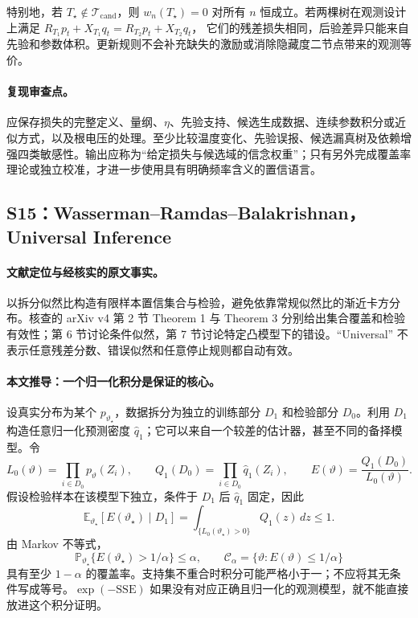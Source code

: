 特别地，若 $T_\star\notin\mathcal T_{\mathrm{cand}}$，则
$w_n(T_\star)=0$ 对所有 $n$ 恒成立。若两棵树在观测设计上满足
$R_{T_1}p_t+X_{T_1}q_t=R_{T_2}p_t+X_{T_2}q_t$，
它们的残差损失相同，后验差异只能来自先验和参数体积。更新规则不会补充缺失的激励或消除隐藏度二节点带来的观测等价。

\paragraph{复现审查点。}
应保存损失的完整定义、量纲、$\eta$、先验支持、候选生成数据、连续参数积分或近似方式，以及根电压的处理。至少比较温度变化、先验误报、候选漏真树及依赖增强四类敏感性。输出应称为“给定损失与候选域的信念权重”；只有另外完成覆盖率理论或独立校准，才进一步使用具有明确频率含义的置信语言。

\subsection{S15：Wasserman--Ramdas--Balakrishnan，Universal Inference}
\label{subsec:S15}

\paragraph{文献定位与经核实的原文事实。}
\citet{S15} 以拆分似然比构造有限样本置信集合与检验，避免依靠常规似然比的渐近卡方分布。核查的 arXiv v4 第 2 节 Theorem 1 与 Theorem 3 分别给出集合覆盖和检验有效性；第 6 节讨论条件似然，第 7 节讨论特定凸模型下的错设。“Universal” 不表示任意残差分数、错误似然和任意停止规则都自动有效。

\paragraph{本文推导：一个归一化积分是保证的核心。}
设真实分布为某个 $p_{\vartheta_\star}$，数据拆分为独立的训练部分 $D_1$ 和检验部分 $D_0$。利用 $D_1$ 构造任意归一化预测密度 $\widehat q_1$；它可以来自一个较差的估计器，甚至不同的备择模型。令
\[
 L_0(\vartheta)=\prod_{i\in D_0}p_\vartheta(Z_i),\qquad
 Q_1(D_0)=\prod_{i\in D_0}\widehat q_1(Z_i),\qquad
 E(\vartheta)=\frac{Q_1(D_0)}{L_0(\vartheta)}.
\]
假设检验样本在该模型下独立，条件于 $D_1$ 后 $\widehat q_1$ 固定，因此
\[
 \mathbb E_{\vartheta_\star}[E(\vartheta_\star)\mid D_1]
 =\int_{\{L_0(\vartheta_\star)>0\}}Q_1(z)\,dz\le1.
\]
由 Markov 不等式，
\[
 \mathbb P_{\vartheta_\star}\{E(\vartheta_\star)>1/\alpha\}\le\alpha,
 \qquad
 \mathcal C_\alpha=\{\vartheta:E(\vartheta)\le1/\alpha\}
\]
具有至少 $1-\alpha$ 的覆盖率。支持集不重合时积分可能严格小于一；不应将其无条件写成等号。$\exp(-\mathrm{SSE})$ 如果没有对应正确且归一化的观测模型，就不能直接放进这个积分证明。

